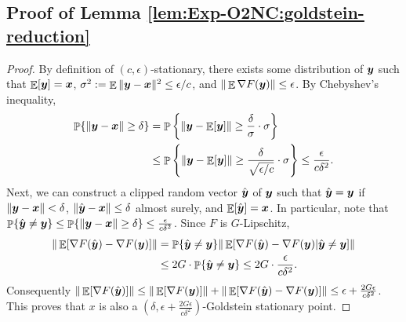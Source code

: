 \subsection{Proof of Lemma \ref{lem:Exp-O2NC:goldstein-reduction}}

\GoldsteinReduction*

\begin{proof}
By definition of $(c,\epsilon)$-stationary, there exists some distribution of $\vecy$ such that $\E[\vecy]=\vecx$, $\sigma^2:=\E\|\vecy-\vecx\|^2 \le \epsilon/c$, and $\|\E \nabla F(\vecy)\| \le \epsilon$. By Chebyshev’s inequality, 
\begin{align*}
    \P\{ \|\vecy-\vecx\| \ge \delta \}
    &= \P\left\{ \|\vecy-\E[\vecy]\| \ge \frac{\delta}{\sigma} \cdot\sigma \right\} \\
    &\le \P\left\{ \|\vecy-\E[\vecy]\| \ge \frac{\delta}{\sqrt{\epsilon/c}} \cdot\sigma \right\} 
    \le \frac{\epsilon}{c\delta^2}.
\end{align*}
Next, we can construct a clipped random vector $\hat \vecy$ of $\vecy$ such that $\hat\vecy = \vecy$ if $\|\vecy-\vecx\|<\delta$, $\|\hat \vecy-\vecx\| \le\delta$ almost surely, and $\E[\hat \vecy]=\vecx$. In particular, note that $\P\{\hat \vecy\ne \vecy\} \le \P\{\|\vecy-\vecx\|\ge \delta\} \le \frac{\epsilon}{c\delta^2}$. Since $F$ is $G$-Lipschitz,
\begin{align*}
    \|\E[\nabla F(\hat\vecy) - \nabla F(\vecy)]\| 
    &= \P\{\hat \vecy \ne \vecy\} \|\E[\nabla F(\hat \vecy)-\nabla F(\vecy) | \hat\vecy\ne \vecy]\| \\
    &\le 2G\cdot \P\{\hat\vecy\ne \vecy\}
    \le 2G \cdot \frac{\epsilon}{c\delta^2}.
\end{align*}
Consequently $\|\E[\nabla F(\hat \vecy)]\| \le \|\E[\nabla F(\vecy)]\| + \|\E[\nabla F(\hat \vecy) - \nabla F(\vecy)]\| \le \epsilon +\frac{2G\epsilon}{c\delta^2}$. This proves that $x$ is also a $(\delta, \epsilon + \frac{2G\epsilon}{c\delta^2})$-Goldstein stationary point. 
\end{proof}